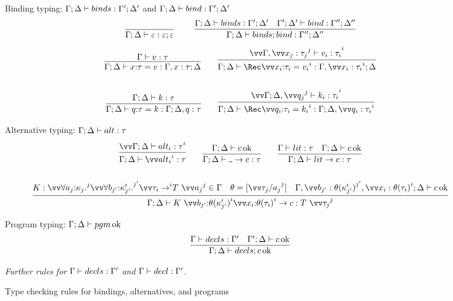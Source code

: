 \documentclass{article}
\begin{document}
\begin{figure}[h]
\centering
Binding typing: $\Gamma; \Delta \vdash binds : \Gamma'; \Delta'$ and
$\Gamma; \Delta \vdash bind : \Gamma'; \Delta'$
\begin{gather*}
  \axiom{\Gamma;\Delta \vdash \mt : \mt;\mt}
  \qquad
  \infer
  {\Gamma;\Delta \vdash \binds; \abind : \Gamma'';\Delta''}
  {
    \Gamma;\Delta \vdash \binds : \Gamma';\Delta'
    &
    \Gamma';\Delta' \vdash \abind : \Gamma'';\Delta''
  }
\end{gather*}
\begin{gather*}
  \infer
  {\Gamma;\Delta \vdash \bind{\ann x \ty}{\tm} : \Gamma,x:\ty;\Delta}
  {\Gamma \vdash \tm : \ty}
  \qquad
  \infer
  {
    \Gamma;\Delta
    \vdash
    \Rec\vect[i]{\bind{\ann{x_i}{\ty_i}}{\tm_i}}
    :
    \Gamma,\vect[i]{x_i:\ty_i};\Delta
  }
  {
    \vect[i]
    {
      \Gamma, \vect[j]{x_j:\ty_j} \vdash \tm_i : \ty_i
    }
  }
  \\\\
  \infer
  {\Gamma;\Delta \vdash \bind{\ann q \ty}{\ko} : \Gamma;\Delta,q:\ty}
  {\Gamma;\Delta \vdash \ko : \ty}
  \qquad
  \infer
  {
    \Gamma;\Delta
    \vdash
    \Rec\vect[i]{\bind{\ann{q_i}{\ty_i}}{\ko_i}}
    :
    \Gamma;\Delta,\vect[i]{q_i:\ty_i}
  }
  {
    \vect[i]
    {
      \Gamma;\Delta,\vect[j]{q_j} \vdash \ko_i : \ty_i
    }
  }  
\end{gather*}

Alternative typing: $\Gamma; \Delta \vdash alt : \tau$
\begin{gather*}
  \infer
  {\Gamma;\Delta \vdash \vect[i]{\analt_i} : \ty}
  {
    \vect[i]{\Gamma;\Delta \vdash \analt_i : \ty}
  }
  \qquad
  \infer
  {\Gamma;\Delta \vdash \alt{\blank}{\com} : \ty}
  {\Gamma;\Delta \vdash \com \Ok}
  \qquad
  \infer
  {\Gamma;\Delta \vdash \alt{\lit}{\com} : \ty}
  {
    \Gamma \vdash \lit : \ty
    &
    \Gamma;\Delta \vdash \com \Ok
  }
  \\\\
  \infer
  {
    \Gamma;\Delta
    \vdash
    \alt{K ~ \vect[i]{\ann{b_{j'}}{\theta(\ki'_{j'})}} \vect[i]{\ann{x_{i}}{\theta(\ty_{i})}}}{\com}
    :
    T ~ \vect[j]{\tau_j}
  }
  {
    K
    :
    \vect[j]{\forall\ann{a_j}{\ki_j}.} \vect[j']{\forall\ann{b_{j'}}{\ki'_{j'}}.}
      \vect[i]{\ty_{i} \to} T ~ \vect[j]{a_j}
    \in
    \Gamma
    &
    \theta = [\vect[j]{\tau_j/a_j}]
    &
    \Gamma,
    \vect[j']{b_{j'}:\theta(\ki'_{j'})},
    \vect[i]{x_{i}:\theta(\ty_{i})};
    \Delta
    \vdash
    \com \Ok
  }
\end{gather*}

Program typing: $\Gamma;\Delta \vdash pgm \operatorname{ok}$
\begin{gather*}
  \infer
  {\Gamma; \Delta \vdash \decls; c \Ok}
  {
    \Gamma \vdash \decls : \Gamma'
    &
    \Gamma';\Delta \vdash c \Ok
  }
\end{gather*}

\emph{Further rules for $\Gamma \vdash decls : \Gamma'$ and
  $\Gamma \vdash decl : \Gamma'$.}
\caption{Type checking rules for bindings, alternatives, and programs}
\label{fig:typing-rules-binds}
\end{figure}
\end{document}

